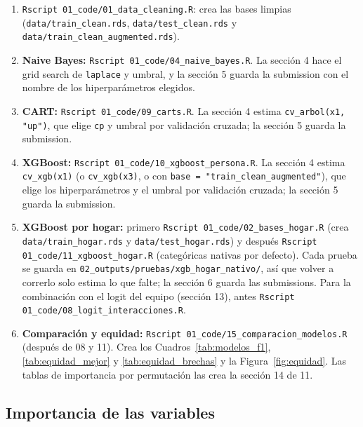 \documentclass[12pt]{article}
\begin{document}
\begin{enumerate}
  \item \texttt{Rscript 01\_code/01\_data\_cleaning.R}: crea las bases limpias
    (\texttt{data/train\_clean.rds}, \texttt{data/test\_clean.rds} y
    \texttt{data/train\_clean\_augmented.rds}).
  \item \textbf{Naive Bayes:} \texttt{Rscript 01\_code/04\_naive\_bayes.R}. La
    sección 4 hace el grid search de \texttt{laplace} y umbral, y la sección 5
    guarda la submission con el nombre de los hiperparámetros elegidos.
  \item \textbf{CART:} \texttt{Rscript 01\_code/09\_carts.R}. La sección 4
    estima \verb|cv_arbol(x1, "up")|, que elige \texttt{cp} y umbral por
    validación cruzada; la sección 5 guarda la submission.
  \item \textbf{XGBoost:} \texttt{Rscript 01\_code/10\_xgboost\_persona.R}. La sección 4
    estima \verb|cv_xgb(x1)| (o \verb|cv_xgb(x3)|, o con
    \verb|base = "train_clean_augmented"|), que elige los hiperparámetros y
    el umbral por validación cruzada; la sección 5 guarda la submission.
  \item \textbf{XGBoost por hogar:} primero
    \texttt{Rscript 01\_code/02\_bases\_hogar.R} (crea
    \texttt{data/train\_hogar.rds} y \texttt{data/test\_hogar.rds}) y después
    \texttt{Rscript 01\_code/11\_xgboost\_hogar.R} (categóricas nativas por
    defecto). Cada prueba se guarda en \texttt{02_outputs/pruebas/xgb\_hogar\_nativo/},
    así que volver a correrlo solo estima lo que falte; la sección 6 guarda
    las submissions. Para la combinación con el logit del equipo (sección 13),
    antes \texttt{Rscript 01\_code/08\_logit\_interacciones.R}.
  \item \textbf{Comparación y equidad:} \texttt{Rscript
    01\_code/15\_comparacion\_modelos.R} (después de 08 y 11). Crea los
    Cuadros~\ref{tab:modelos_f1}, \ref{tab:equidad_mejor} y
    \ref{tab:equidad_brechas} y la Figura~\ref{fig:equidad}. Las tablas de
    importancia por permutación las crea la sección 14 de 11.
\end{enumerate}

\subsection{Importancia de las variables}
\end{document}

